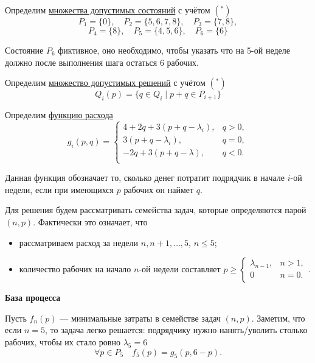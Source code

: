 \bigskip

Определим \underline{множества допустимых состояний} с учётом $(^*)$
\[
P_1 = \{0\}, \quad P_2 = \{5, 6, 7, 8\}, \quad P_3 = \{7, 8\},
\]
\[
P_4 = \{8\}, \quad P_5 = \{4, 5, 6\}, \quad P_6 = \{6\}
\]

Состояние $P_6$ фиктивное, оно необходимо, чтобы указать что на 5-ой неделе должно после выполнения шага остаться 6 рабочих. 

\bigskip

Определим \underline{множество допустимых решений} с учётом $(^*)$ 
\[Q_i(p) = \{q \in Q_i \; \big| \; p + q \in P_{i + 1} \}\]

\bigskip

Определим \underline{функцию расхода}
\[g_i(p,q) = \begin{cases}\tag{*}
	4 + 2q + 3(p + q - \lambda_i),& q > 0, \\
	3(p + q - \lambda_i),& q = 0, \\
	-2q + 3(p + q - \lambda),& q < 0. \\
\end{cases}\]

Данная функция обозначает то, сколько денег потратит подрядчик в начале $i$-ой недели, если при имеющихся $p$ рабочих он наймет $q$. 

\bigskip

Для решения будем рассматривать семейства задач, которые определяются парой $(n, p)$. Фактически это означает, что

\begin{itemize}[nosep]
	\item рассматриваем расход за недели $n, n+1, \dots, 5$, $n \le 5$;
	
	\item количество рабочих на начало $n$-ой недели составляет $p \ge \begin{cases}
		\lambda_{n - 1},& n > 1, \\
		 0& n = 0. \\
	\end{cases}$.
\end{itemize}

\bigskip

\textbf{База процесса}

Пусть $f_n(p)$ --- минимальные затраты в семействе задач $(n, p)$. Заметим, что если $n = 5$, то задача легко решается: подрядчику нужно нанять/уволить столько рабочих, чтобы их стало ровно $\lambda_5 = 6$
\[
\forall p \in P_5 \quad f_5(p) = g_5(p, 6 - p).
\]


